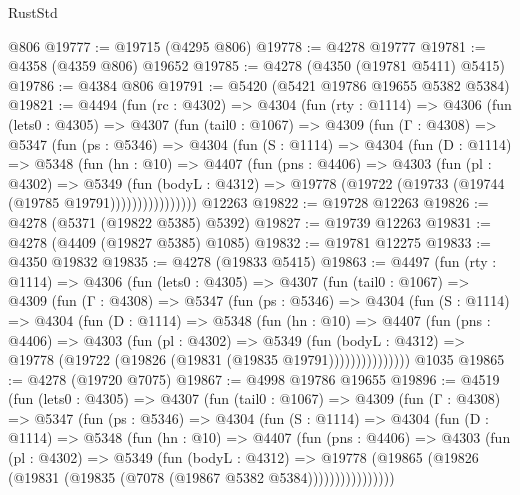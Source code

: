 \begin{lexlean}{RustStd}
\begin{coremodule}
    @806
@19777 := @19715 (@4295 @806)
@19778 := @4278 @19777
@19781 := @4358 (@4359 @806) @19652
@19785 := @4278 (@4350 (@19781 @5411) @5415)
@19786 := @4384 @806
@19791 := @5420 (@5421 @19786 @19655 @5382 @5384)
@19821 := @4494
    (fun (rc : @4302) =>
    @4304
      (fun (rty : @1114) =>
      @4306
        (fun (lets0 : @4305) =>
        @4307
          (fun (tail0 : @1067) =>
          @4309
            (fun (Γ : @4308) =>
            @5347
              (fun (ps : @5346) =>
              @4304
                (fun (S : @1114) =>
                @4304
                  (fun (D : @1114) =>
                  @5348
                    (fun (hn : @10) =>
                    @4407
                      (fun (pns : @4406) =>
                      @4303
                        (fun (pl : @4302) =>
                        @5349
                          (fun (bodyL : @4312) =>
                          @19778 (@19722 (@19733 (@19744 (@19785 @19791))))))))))))))))
    @12263
@19822 := @19728 @12263
@19826 := @4278 (@5371 (@19822 @5385) @5392)
@19827 := @19739 @12263
@19831 := @4278 (@4409 (@19827 @5385) @1085)
@19832 := @19781 @12275
@19833 := @4350 @19832
@19835 := @4278 (@19833 @5415)
@19863 := @4497
    (fun (rty : @1114) =>
    @4306
      (fun (lets0 : @4305) =>
      @4307
        (fun (tail0 : @1067) =>
        @4309
          (fun (Γ : @4308) =>
          @5347
            (fun (ps : @5346) =>
            @4304
              (fun (S : @1114) =>
              @4304
                (fun (D : @1114) =>
                @5348
                  (fun (hn : @10) =>
                  @4407
                    (fun (pns : @4406) =>
                    @4303
                      (fun (pl : @4302) =>
                      @5349
                        (fun (bodyL : @4312) =>
                        @19778 (@19722 (@19826 (@19831 (@19835 @19791)))))))))))))))
    @1035
@19865 := @4278 (@19720 @7075)
@19867 := @4998 @19786 @19655
@19896 := @4519
    (fun (lets0 : @4305) =>
    @4307
      (fun (tail0 : @1067) =>
      @4309
        (fun (Γ : @4308) =>
        @5347
          (fun (ps : @5346) =>
          @4304
            (fun (S : @1114) =>
            @4304
              (fun (D : @1114) =>
              @5348
                (fun (hn : @10) =>
                @4407
                  (fun (pns : @4406) =>
                  @4303
                    (fun (pl : @4302) =>
                    @5349
                      (fun (bodyL : @4312) =>
                      @19778
                        (@19865 (@19826 (@19831 (@19835 (@7078 (@19867 @5382 @5384))))))))))))))))

\end{coremodule}
\end{lexlean}
